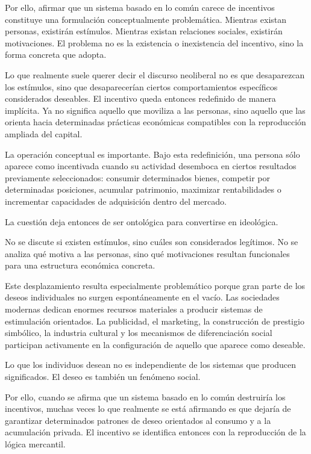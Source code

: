 \documentclass[11pt,a4paper]{article}
\begin{document}
Por ello, afirmar que un sistema basado en lo común carece de incentivos constituye una formulación conceptualmente problemática. Mientras existan personas, existirán estímulos. Mientras existan relaciones sociales, existirán motivaciones. El problema no es la existencia o inexistencia del incentivo, sino la forma concreta que adopta.

Lo que realmente suele querer decir el discurso neoliberal no es que desaparezcan los estímulos, sino que desaparecerían ciertos comportamientos específicos considerados deseables. El incentivo queda entonces redefinido de manera implícita. Ya no significa aquello que moviliza a las personas, sino aquello que las orienta hacia determinadas prácticas económicas compatibles con la reproducción ampliada del capital.

La operación conceptual es importante. Bajo esta redefinición, una persona sólo aparece como incentivada cuando su actividad desemboca en ciertos resultados previamente seleccionados: consumir determinados bienes, competir por determinadas posiciones, acumular patrimonio, maximizar rentabilidades o incrementar capacidades de adquisición dentro del mercado.

La cuestión deja entonces de ser ontológica para convertirse en ideológica.

No se discute si existen estímulos, sino cuáles son considerados legítimos. No se analiza qué motiva a las personas, sino qué motivaciones resultan funcionales para una estructura económica concreta.

Este desplazamiento resulta especialmente problemático porque gran parte de los deseos individuales no surgen espontáneamente en el vacío. Las sociedades modernas dedican enormes recursos materiales a producir sistemas de estimulación orientados. La publicidad, el marketing, la construcción de prestigio simbólico, la industria cultural y los mecanismos de diferenciación social participan activamente en la configuración de aquello que aparece como deseable.

Lo que los individuos desean no es independiente de los sistemas que producen significados. El deseo es también un fenómeno social.

Por ello, cuando se afirma que un sistema basado en lo común destruiría los incentivos, muchas veces lo que realmente se está afirmando es que dejaría de garantizar determinados patrones de deseo orientados al consumo y a la acumulación privada. El incentivo se identifica entonces con la reproducción de la lógica mercantil.
\end{document}
